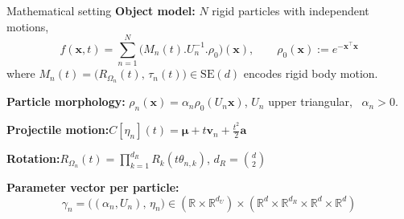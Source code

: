 \documentclass{beamer}
\begin{document}
    \begin{frame}{Mathematical setting}
        \textbf{Object model:} $N$ rigid particles with independent motions,
        $$
            f(\mathbf{x}, t) = \sum_{n=1}^{N} \bigl(M_n(t).U_n^{-1}.\rho_0\bigr)(\mathbf{x}), \qquad \rho_0(\mathbf{x}) := e^{-\mathbf{x}^\top \mathbf{x}}
        $$
        where $M_n(t) = \bigl(R_{\Omega_n}(t),\, \tau_n(t)\bigr) \in \mathrm{SE}(d)$ encodes rigid body motion.

        \vspace{0.5em}
        \pause
        \textbf{Particle morphology:} $\rho_n(\mathbf{x}) = \alpha_n \rho_0(U_n \mathbf{x})$, \quad $U_n$ upper triangular, \, $\alpha_n > 0$.

        \vspace{0.5em}
        \textbf{Projectile motion:}\quad $C[\eta_n](t) = \boldsymbol{\mu} + t\mathbf{v}_n + \tfrac{t^2}{2}\mathbf{a}$

        \vspace{0.3em}
        \textbf{Rotation:}\quad $R_{\Omega_n}(t) = \prod_{k=1}^{d_R} R_k(t\theta_{n,k})$, \quad $d_R = \binom{d}{2}$

        \vspace{0.5em}
        \textbf{Parameter vector per particle:}
        $$
            \gamma_n = \bigl((\alpha_n, U_n),\, \eta_n\bigr) \in (\mathbb{R} \times \mathbb{R}^{d_U}) \times (\mathbb{R}^d \times \mathbb{R}^{d_R} \times \mathbb{R}^d \times \mathbb{R}^d)
        $$

    \end{frame}
\end{document}
